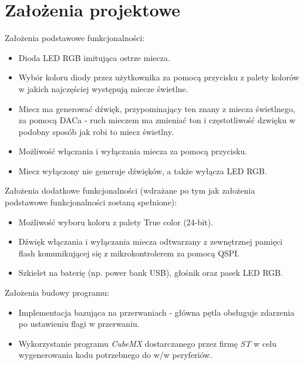 \documentclass[10pt, a4paper]{article}
\begin{document}
\section{Założenia projektowe} %
	\begin{flushleft}
	Założenia podstawowe funkcjonalności:\\
	\end{flushleft}
	\begin{itemize}
		\item Dioda LED RGB imitująca ostrze miecza.
		\item Wybór koloru diody przez użytkownika za pomocą przycisku z palety kolorów w jakich najczęściej występują miecze świetlne.
		\item Miecz ma generować dźwięk, przypominający ten znany z miecza świetlnego, za pomocą DACa - ruch mieczem ma zmieniać ton i częstotliwość dzwięku w podobny sposób jak robi to miecz świetlny.
		\item Możliwość włączania i wyłączania miecza za pomocą przycisku.
		\item Miecz wyłączony nie generuje dźwięków, a także wyłącza LED RGB.
	\end{itemize}
	\vspace{5mm}
	\begin{flushleft}
	Założenia dodatkowe funkcjonalności (wdrażane po tym jak założenia podstawowe funkcjonalności zostaną spełnione):\\
	\end{flushleft}
	\begin{itemize}
		\item Możliwość wyboru koloru z palety True color (24-bit).
		\item Dźwięk włączania i wyłączania miecza odtwarzany z zewnętrznej pamięci flash komunikującej się z mikrokontrolerem za pomocą QSPI.
		\item Szkielet na baterię (np. power bank USB), głośnik oraz pasek LED RGB.
	\end{itemize}
	\vspace{5mm}
	\begin{flushleft}
	Założenia budowy programu:\\
	\end{flushleft}
	\begin{itemize}
		\item Implementacja bazująca na przerwaniach - główna pętla obsługuje zdarzenia po ustawieniu flagi w przerwaniu.
		\item Wykorzystanie programu \textit{CubeMX} dostarczanego przez firmę \textit{ST} w celu wygenerowania kodu potrzebnego do w/w peryferiów.
	\end{itemize}
\end{document}
